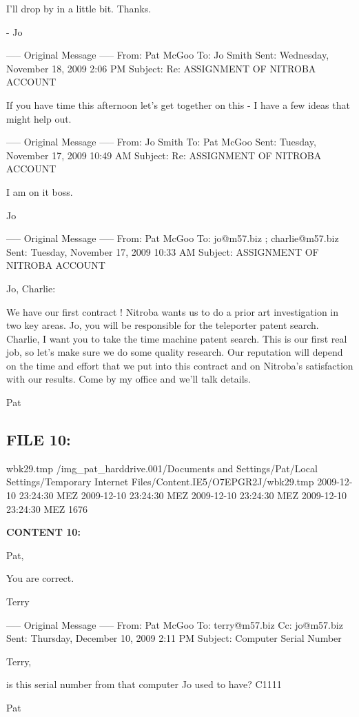 I'll drop by in a little bit.  Thanks.

- Jo

----- Original Message -----
From: Pat McGoo
To: Jo Smith
Sent: Wednesday, November 18, 2009 2:06 PM
Subject: Re: ASSIGNMENT OF NITROBA ACCOUNT

If you have time this afternoon let's get together on this - I have a few
ideas that might help out.

----- Original Message -----
From: Jo Smith
To: Pat McGoo
Sent: Tuesday, November 17, 2009 10:49 AM
Subject: Re: ASSIGNMENT OF NITROBA ACCOUNT

I am on it boss.

Jo

----- Original Message -----
From: Pat McGoo
To: jo@m57.biz ; charlie@m57.biz
Sent: Tuesday, November 17, 2009 10:33 AM
Subject: ASSIGNMENT OF NITROBA ACCOUNT

Jo, Charlie:

We have our first contract !  Nitroba wants us to do a prior art
investigation in two key areas.  Jo, you will be responsible for the
teleporter patent search.  Charlie, I want you to take the time
machine patent search.  This is our first real job, so let's make
sure we do some quality research.  Our reputation will depend on the
time and effort that we put into this contract and on Nitroba's
satisfaction with our results.  Come by my office and we'll talk
details.

Pat


\subsection{FILE 10:}
wbk29.tmp	/img_pat_harddrive.001/Documents and Settings/Pat/Local Settings/Temporary Internet Files/Content.IE5/O7EPGR2J/wbk29.tmp		2009-12-10 23:24:30 MEZ	2009-12-10 23:24:30 MEZ	2009-12-10 23:24:30 MEZ	2009-12-10 23:24:30 MEZ	1676	

\textbf{CONTENT 10:}

Pat,

You are correct.

Terry

----- Original Message -----
From: Pat McGoo
To: terry@m57.biz
Cc: jo@m57.biz
Sent: Thursday, December 10, 2009 2:11 PM
Subject: Computer Serial Number

Terry,

is this serial number from that computer Jo used to have?  C1111

Pat



